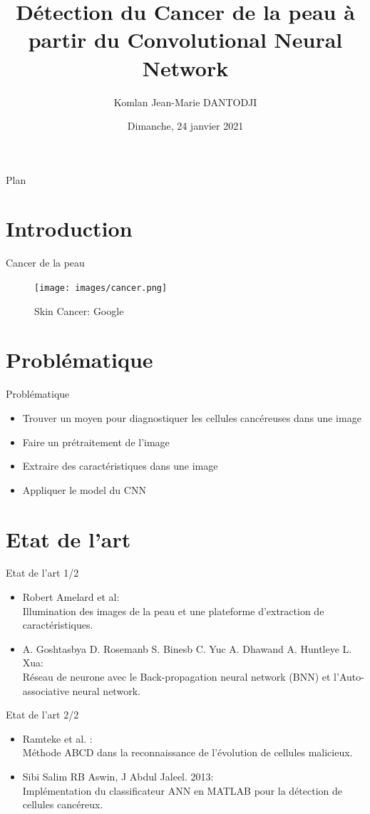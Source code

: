 \documentclass{beamer}
\title[Détection du Cancer de la peau] 
{Détection du Cancer de la peau à partir du Convolutional Neural Network}
\author[Komlan Dantodji] 
{Komlan Jean-Marie DANTODJI}
\institute[]
{
  Etudiant en M1 Big Data
  \and
  Université Paris 8}
\date{Dimanche, 24 janvier 2021}
\begin{document}
\begin{frame}
  \titlepage
\end{frame}

\begin{frame}{Plan}
  \tableofcontents
\end{frame}

\section{Introduction}
\begin{frame}{Cancer de la peau}
\begin{figure}[H]
    \texttt{[image: images/cancer.png]}
    \caption{ Skin Cancer: Google}
    \label{fig:L1}
\end{figure}
\end{frame}

\section{Problématique}
\begin{frame}{Problématique}
\begin{itemize}
		\item Trouver un moyen pour diagnostiquer les cellules cancéreuses dans une image
		\item Faire un prétraitement de l'image
		\item Extraire des caractéristiques dans une image
		\item Appliquer le model du CNN
\end{itemize}
\end{frame} 

\section{Etat de l'art}
\begin{frame}{Etat de l'art 1/2}
\begin{itemize}
		\item Robert Amelard et al:\\
		Illumination des images de la peau et une plateforme d’extraction de caractéristiques.
		\item A. Goshtasbya D. Rosemanb S. Binesb C. Yuc A. Dhawand A. Huntleye L. Xua:\\
		Réseau de neurone avec le Back-propagation neural network (BNN) et l’Auto-associative neural network.
\end{itemize}
\end{frame} 
\begin{frame}{Etat de l'art 2/2}
\begin{itemize}
		\item Ramteke et al. : \\
		Méthode ABCD dans la reconnaissance de l’évolution de cellules malicieux.
		\item Sibi Salim RB Aswin, J Abdul Jaleel. 2013: \\
		Implémentation du classificateur ANN en MATLAB pour la détection de cellules cancéreux.
\end{itemize}
\end{frame} 
\end{document}
